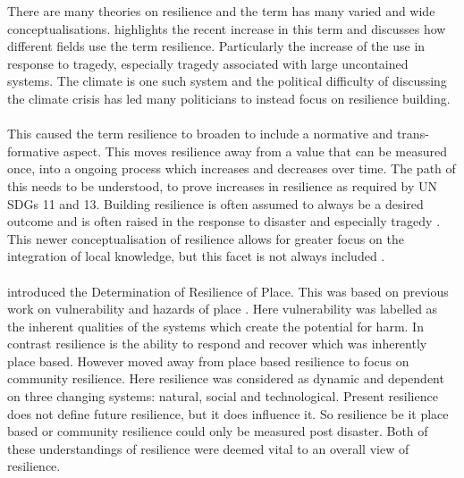 There are many theories on resilience and the term has many varied and wide conceptualisations. \cite{moser_turbulent_2019} highlights the recent increase in this term and discusses how different fields use the term resilience. Particularly the increase of the use in response to tragedy, especially tragedy associated with large uncontained systems. The climate is one such system and the political difficulty of discussing the climate crisis has led many politicians to instead focus on resilience building. 
\paragraph{}

This caused the term resilience to broaden to include a normative and trans-formative aspect.  This moves resilience away from a value that can be measured once, into a ongoing process which increases and decreases over time. The path of this needs to be understood, to prove increases in resilience as required by UN SDGs 11 and 13. Building resilience is often assumed to always be a desired outcome and is often raised in the response to disaster and especially tragedy \cite{moser_turbulent_2019}. This newer conceptualisation of resilience allows for greater focus on the integration of local knowledge, but this facet is not always included \cite{moser_turbulent_2019}.
\paragraph{}


\cite{cutter_place-based_2008} introduced the Determination of Resilience of Place. This was based on previous work on vulnerability and hazards of place \cite{cutter_vulnerability_1996}. Here vulnerability was labelled as the inherent qualities of the systems which create the potential for harm.
In contrast resilience is the ability to respond and recover which was inherently place based. However \cite{cutter_community_2020} moved away from place based resilience to focus on community resilience. Here resilience was considered as dynamic and dependent on three changing systems: natural, social and technological. Present resilience does not define future resilience, but it does influence it. So resilience be it place based or community resilience could only be measured post disaster. Both of these understandings of resilience were deemed vital to an overall view of resilience.
\paragraph{}

